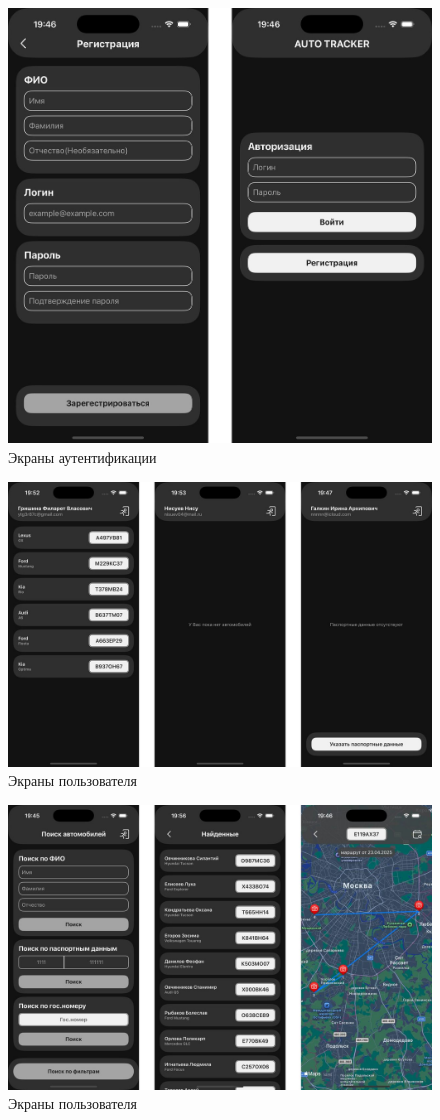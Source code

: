 \begin{figure}[H]
    \centering
    \includegraphics[width=0.6\linewidth]{images/interface/auth.png}
    \caption{Экраны аутентификации}
    \label{fig:int:auth}
\end{figure}
\begin{figure}[H]
    \centering
    \includegraphics[width=0.8\linewidth]{images/interface/user.png}
    \caption{Экраны пользователя}
    \label{fig:int:user}
\end{figure}
\begin{figure}[H]
    \centering
    \includegraphics[width=0.8\linewidth]{images/interface/operator.png}
    \caption{Экраны пользователя}
    \label{fig:int:operator}
\end{figure}
